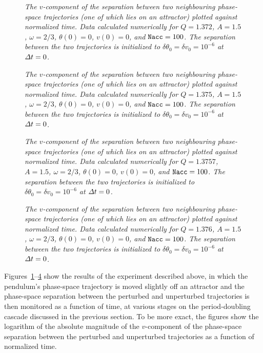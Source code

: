 \begin{figure}
\epsfysize=3in
\centerline{}
\caption{\em The $v$-component of the separation between two neighbouring
phase-space trajectories (one of which lies on an attractor) plotted against normalized time. Data
 calculated numerically for $Q=1.372$, 
$A=1.5$, $\omega=2/3$, $\theta(0)=0$, $v(0)=0$, and ${\tt Nacc} =100$. The separation between the
two trajectories is initialized to $\delta\theta_0=\delta v_0 = 10^{-6}$ at
${\mit\Delta} t = 0$.}\label{f40}
\end{figure}

\begin{figure}
\epsfysize=3in
\centerline{}
\caption{\em The $v$-component of the separation between two neighbouring
phase-space trajectories  (one of which lies on an attractor) plotted against normalized time. Data
 calculated numerically for $Q=1.375$, 
$A=1.5$, $\omega=2/3$, $\theta(0)=0$, $v(0)=0$, and ${\tt Nacc} =100$. The separation between the
two trajectories is initialized to $\delta\theta_0=\delta v_0 = 10^{-6}$ at
${\mit\Delta} t = 0$.}\label{f41}
\end{figure}

\begin{figure}
\epsfysize=3in
\centerline{}
\caption{\em The $v$-component of the separation between two neighbouring
phase-space trajectories (one of which lies on an attractor) plotted against normalized time. Data
calculated numerically for $Q=1.3757$, 
$A=1.5$, $\omega=2/3$, $\theta(0)=0$, $v(0)=0$, and ${\tt Nacc} =100$. The separation between the
two trajectories is initialized to $\delta\theta_0=\delta v_0 = 10^{-6}$ at
${\mit\Delta} t = 0$.}\label{f42}
\end{figure}

\begin{figure}
\epsfysize=3in
\centerline{}
\caption{\em The $v$-component of the separation between two neighbouring
phase-space trajectories (one of which lies on an attractor) plotted against normalized time. Data
 calculated numerically for $Q=1.376$, 
$A=1.5$, $\omega=2/3$, $\theta(0)=0$, $v(0)=0$, and ${\tt Nacc} =100$. The separation between the
two trajectories is initialized to $\delta\theta_0=\delta v_0 = 10^{-6}$ at
${\mit\Delta} t = 0$.}\label{f43}
\end{figure}

Figures~\ref{f40}--\ref{f43} show the results of the experiment described above,
in which the pendulum's phase-space trajectory is moved slightly off an attractor
and the phase-space separation between the perturbed and unperturbed trajectories
is then monitored as a function of time,
at various stages on the period-doubling cascade discussed in the previous section. 
To be more exact, the figures show the logarithm of the absolute magnitude of the
$v$-component of the phase-space separation between the perturbed and unperturbed
trajectories as  a function of normalized time.

